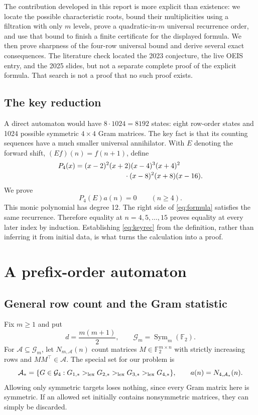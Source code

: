 \documentclass[11pt,letterpaper]{article}
\theoremstyle{definition}
\newcommand{\F}{\mathbb F_2}
\newcommand{\Sym}{\operatorname{Sym}}
\newcommand{\Astar}{\mathcal A_*}
\newcommand{\1}{\mathbf 1}
\newcommand{\revlex}{>_{\rm lex}}
\begin{document}
The contribution developed in this report is more explicit than existence:
we locate the possible characteristic roots, bound their multiplicities using
a filtration with only $m$ levels, prove a quadratic-in-$m$ universal recurrence
order, and use that bound to finish a finite certificate for the displayed
formula. We then prove sharpness of the four-row universal bound and derive
several exact consequences. The literature check located the 2023 conjecture,
the live OEIS entry, and the 2025 slides, but not a separate complete proof of
the explicit formula. That search is not a proof that no such proof exists.

\subsection{The key reduction}
A direct automaton would have $8\cdot1024=8192$ states: eight row-order states
and 1024 possible symmetric $4\times4$ Gram matrices. The key fact is that its
counting sequences have a much smaller universal annihilator. With $E$ denoting
the forward shift, $(Ef)(n)=f(n+1)$, define
\begin{align}
 P_4(x)={}&(x-2)^2(x+2)(x-4)^3(x+4)^2\notag\\[-2pt]
 &\hspace{20mm}\cdot(x-8)^2(x+8)(x-16).
 \label{eq:P4}
\end{align}
We prove
\begin{equation}\label{eq:keyrec}
 P_4(E)a(n)=0\qquad(n\ge4).
\end{equation}
This monic polynomial has degree 12. The right side of \eqref{eq:formula}
satisfies the same recurrence. Therefore equality at $n=4,5,\ldots,15$ proves
equality at every later index by induction. Establishing \eqref{eq:keyrec}
from the definition, rather than inferring it from initial data, is what turns
the calculation into a proof.

\section{A prefix-order automaton}
\label{sec:automaton}

\subsection{General row count and the Gram statistic}
Fix $m\ge1$ and put
\[
 d=\frac{m(m+1)}2,
 \qquad \mathcal G_m=\Sym_m(\F).
\]
For $\mathcal A\subseteq\mathcal G_m$, let $N_{m,\mathcal A}(n)$ count matrices
$M\in\F^{m\times n}$ with strictly increasing rows and $MM^\top\in\mathcal A$.
The special set for our problem is
\[
 \Astar=\{G\in\mathcal G_4:
 G_{1,*}\revlex G_{2,*}\revlex G_{3,*}\revlex G_{4,*}\},
 \qquad a(n)=N_{4,\Astar}(n).
\]
Allowing only symmetric targets loses nothing, since every Gram matrix here is
symmetric. If an allowed set initially contains nonsymmetric matrices, they can
simply be discarded.
\end{document}
